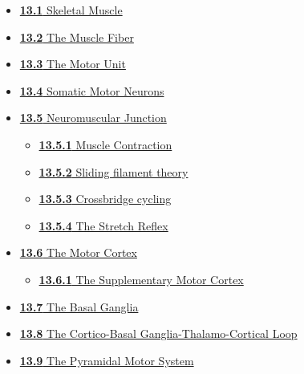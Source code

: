 \begin{itemize}
  \begin{itemize}
  \tightlist
  \item
    \href{the-somatic-motor-system.html\#skeletal-muscle}{\emph{}\textbf{13.1}
    Skeletal Muscle}
  \item
    \href{the-somatic-motor-system.html\#the-muscle-fiber}{\emph{}\textbf{13.2}
    The Muscle Fiber}
  \item
    \href{the-somatic-motor-system.html\#the-motor-unit}{\emph{}\textbf{13.3}
    The Motor Unit}
  \item
    \href{the-somatic-motor-system.html\#somatic-motor-neurons}{\emph{}\textbf{13.4}
    Somatic Motor Neurons}
  \item
    \href{the-somatic-motor-system.html\#neuromuscular-junction}{\emph{}\textbf{13.5}
    Neuromuscular Junction}

    \begin{itemize}
    \tightlist
    \item
      \href{the-somatic-motor-system.html\#muscle-contraction}{\emph{}\textbf{13.5.1}
      Muscle Contraction}
    \item
      \href{the-somatic-motor-system.html\#sliding-filament-theory}{\emph{}\textbf{13.5.2}
      Sliding filament theory}
    \item
      \href{the-somatic-motor-system.html\#crossbridge-cycling}{\emph{}\textbf{13.5.3}
      Crossbridge cycling}
    \item
      \href{the-somatic-motor-system.html\#the-stretch-reflex}{\emph{}\textbf{13.5.4}
      The Stretch Reflex}
    \end{itemize}
  \item
    \href{the-somatic-motor-system.html\#the-motor-cortex}{\emph{}\textbf{13.6}
    The Motor Cortex}

    \begin{itemize}
    \tightlist
    \item
      \href{the-somatic-motor-system.html\#the-supplementary-motor-cortex}{\emph{}\textbf{13.6.1}
      The Supplementary Motor Cortex}
    \end{itemize}
  \item
    \href{the-somatic-motor-system.html\#the-basal-ganglia-1}{\emph{}\textbf{13.7}
    The Basal Ganglia}
  \item
    \href{the-somatic-motor-system.html\#the-cortico-basal-ganglia-thalamo-cortical-loop}{\emph{}\textbf{13.8}
    The Cortico-Basal Ganglia-Thalamo-Cortical Loop}
  \item
    \href{the-somatic-motor-system.html\#the-pyramidal-motor-system}{\emph{}\textbf{13.9}
    The Pyramidal Motor System}


\end{itemize}
\end{itemize}
